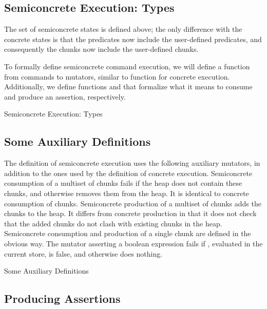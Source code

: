 \documentclass{CSML}
\theoremstyle{definition}\newtheorem{notation}[thm]{Notation}
\theoremstyle{plain}\newtheorem{satz}[thm]{Satz}
\begin{document}
\subsection{Semiconcrete Execution: Types}

The set  of semiconcrete states is defined 
above; the only difference with the concrete states is that the 
predicates now include the user-defined predicates, and 
consequently the chunks now include the user-defined chunks.

To formally define semiconcrete command execution, we will 
define a function  from commands to mutators, 
similar to function  for concrete execution. 
Additionally, we define functions  and 
 that formalize what it means to consume and 
produce an assertion, respectively.

\begin{defi}{Semiconcrete Execution: Types}





\end{defi}

\subsection{Some Auxiliary Definitions}

The definition of semiconcrete execution uses the following auxiliary 
mutators, in addition to the ones used by the definition of concrete 
execution. Semiconcrete consumption  of a multiset of 
chunks  fails if the heap does not contain these chunks, and otherwise 
removes them from the heap. It is identical to concrete consumption of 
chunks. Semiconcrete production  of a multiset of 
chunks  adds the chunks to the heap. It differs from concrete 
production in that it does not check that the added chunks do not clash 
with existing chunks in the heap. 
Semiconcrete consumption and production of a single chunk  are defined in the obvious way.
The mutator  
asserting a boolean expression  fails if , evaluated in the current 
store, is false, and otherwise does nothing. 

\begin{defi}{Some Auxiliary Definitions}



\end{defi}

\subsection{Producing Assertions}
\end{document}
